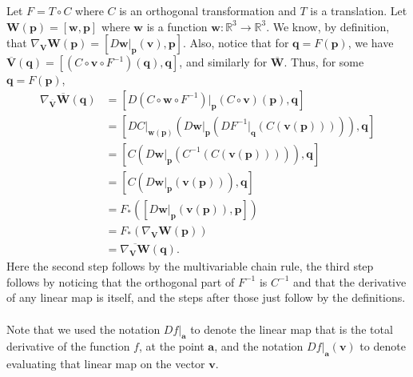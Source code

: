 \documentclass[12 pt, letterpaper]{hmcpset}
\begin{document}
\begin{solution}
	Let $F = T \circ C$ where $C$ is an orthogonal transformation and $T$ is a translation. Let $\mathbf{W}(\mathbf{p}) = [\mathbf{w}, \mathbf{p}]$ where $\mathbf{w}$ is a function $\mathbf{w} : \mathbb{R}^{3} \to \mathbb{R}^{3}$.
	We know, by definition, that $\nabla_{\mathbf{V}} \mathbf{W}(\mathbf{p}) = [D\mathbf{w} \Big |_{\mathbf{p}}(\mathbf{v}), \mathbf{p}]$. Also, notice that for $\mathbf{q} = F(\mathbf{p})$, we have $\overline{\mathbf{V}}(\mathbf{q}) = [(C \circ \mathbf{v} \circ F^{-1})(\mathbf{q}), \mathbf{q}]$, and similarly for $\overline{\mathbf{W}}$. Thus, for some $\mathbf{q} = F(\mathbf{p})$,
	\[
		\begin{split}
			\nabla_{\overline{\mathbf{V}}} \overline{\mathbf{W}}(\mathbf{q}) & = [D(C \circ \mathbf{w} \circ F^{-1}) \Big |_{\mathbf{p}} (C \circ \mathbf{v})(\mathbf{p}), \mathbf{q}] \\
									      & = \left [ DC \Big |_{\mathbf{w}(\mathbf{p})} \left ( D \mathbf{w} \Big |_{\mathbf{p}} \left ( DF^{-1} \Big |_{\mathbf{q}} (C(\mathbf{v}(\mathbf{p}))) \right ) \right ), \mathbf{q} \right ] \\
									      & = \left [ C \left ( D\mathbf{w} \Big |_{\mathbf{p}} (C^{-1}(C(\mathbf{v}(\mathbf{p})))) \right ), \mathbf{q} \right ] \\
									      & = \left [ C \left ( D \mathbf{w} \Big |_{\mathbf{p}} (\mathbf{v}(\mathbf{p})) \right ), \mathbf{q} \right ] \\
									      & = F_{*} \left ( \left [ D\mathbf{w} \Big |_{\mathbf{p}} (\mathbf{v}(\mathbf{p})), \mathbf{p} \right ] \right ) \\
									      & = F_{*}(\nabla_{\mathbf{V}} \mathbf{W}(\mathbf{p})) \\
									      & = \overline{\nabla_{\mathbf{V}} \mathbf{W}}{(\mathbf{q})}.
		\end{split}
	\]
	Here the second step follows by the multivariable chain rule, the third step follows by noticing that the orthogonal part of $F^{-1}$ is $C^{-1}$ and that the derivative of any linear map is itself, and the steps after those just follow by the definitions. \\\\
	Note that we used the notation $Df \Big |_{\mathbf{a}}$ to denote the linear map that is the total derivative of the function $f$, at the point $\mathbf{a}$, and the notation $Df \Big |_{\mathbf{a}}(\mathbf{v})$ to denote evaluating that linear map on the vector $\mathbf{v}$.
\end{solution}
\end{document}
